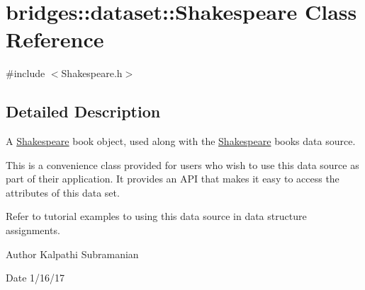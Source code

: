 \hypertarget{classbridges_1_1dataset_1_1_shakespeare}{}\section{bridges\+:\+:dataset\+:\+:Shakespeare Class Reference}
\label{classbridges_1_1dataset_1_1_shakespeare}


{\ttfamily \#include $<$Shakespeare.\+h$>$}



\subsection{Detailed Description}
A \mbox{\hyperlink{classbridges_1_1dataset_1_1_shakespeare}{Shakespeare}} book object, used along with the \mbox{\hyperlink{classbridges_1_1dataset_1_1_shakespeare}{Shakespeare}} books data source. 

This is a convenience class provided for users who wish to use this data source as part of their application. It provides an A\+PI that makes it easy to access the attributes of this data set.

Refer to tutorial examples to using this data source in data structure assignments.

\begin{DoxyAuthor}{Author}
Kalpathi Subramanian 
\end{DoxyAuthor}
\begin{DoxyDate}{Date}
1/16/17 
\end{DoxyDate}
